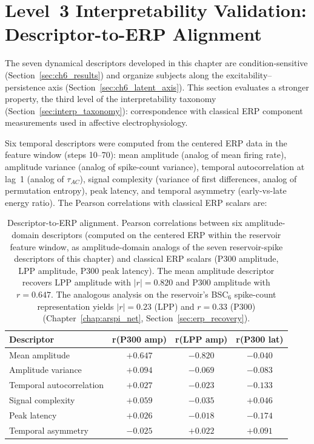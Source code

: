 \section{Level~3 Interpretability Validation: Descriptor-to-ERP Alignment}
\label{sec:ch6_erp_alignment}

The seven dynamical descriptors developed in this chapter are condition-sensitive (Section~\ref{sec:ch6_results}) and organize subjects along the excitability--persistence axis (Section~\ref{sec:ch6_latent_axis}). This section evaluates a stronger property, the third level of the interpretability taxonomy (Section~\ref{sec:interp_taxonomy}): correspondence with classical ERP component measurements used in affective electrophysiology.

Six temporal descriptors were computed from the centered ERP data in the feature window (steps 10--70): mean amplitude (analog of mean firing rate), amplitude variance (analog of spike-count variance), temporal autocorrelation at lag~1 (analog of $\tau_{AC}$), signal complexity (variance of first differences, analog of permutation entropy), peak latency, and temporal asymmetry (early-vs-late energy ratio). The Pearson correlations with classical ERP scalars are:

\begin{table}[H]
\centering
\caption{Descriptor-to-ERP alignment. Pearson correlations between six amplitude-domain descriptors (computed on the centered ERP within the reservoir feature window, as amplitude-domain analogs of the seven reservoir-spike descriptors of this chapter) and classical ERP scalars (P300 amplitude, LPP amplitude, P300 peak latency). The mean amplitude descriptor recovers LPP amplitude with $|r| = 0.820$ and P300 amplitude with $r = 0.647$. The analogous analysis on the reservoir's BSC$_6$ spike-count representation yields $|r| = 0.23$ (LPP) and $r = 0.33$ (P300) (Chapter~\ref{chap:arspi_net}, Section~\ref{sec:erp_recovery}).}
\label{tab:descriptor_erp}
\begin{tabular}{lccc}
\toprule
\textbf{Descriptor} & \textbf{r(P300 amp)} & \textbf{r(LPP amp)} & \textbf{r(P300 lat)} \\
\midrule
Mean amplitude & $+0.647$ & $-0.820$ & $-0.040$ \\
Amplitude variance & $+0.094$ & $-0.069$ & $-0.083$ \\
Temporal autocorrelation & $+0.027$ & $-0.023$ & $-0.133$ \\
Signal complexity & $+0.059$ & $-0.035$ & $+0.046$ \\
Peak latency & $+0.026$ & $-0.018$ & $-0.174$ \\
Temporal asymmetry & $-0.025$ & $+0.022$ & $+0.091$ \\
\bottomrule
\end{tabular}
\end{table}

